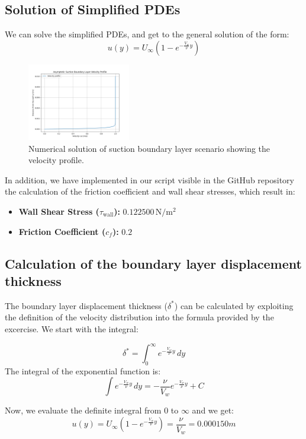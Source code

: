 \documentclass{article}
\begin{document}
\subsection{Solution of Simplified PDEs}
We can solve the simplified PDEs, and get to the general solution of the form:
\[
u(y) = U_\infty \left(1 - e^{-\frac{V_w}{\nu} y}\right)
\]
\begin{figure}[]
    \centering
    \includegraphics[width=0.4\textwidth]{output_plot.png}
    \caption{Numerical solution of suction boundary layer scenario showing the velocity profile.}
    \label{fig:suction boundary layer_solution}
\end{figure}

In addition, we have implemented in our script visible in the GitHub repository \cite{GitHubRepo} the calculation of the friction coefficient and wall shear stresses, which result in:
\begin{itemize}
    \item \textbf{Wall Shear Stress (\(\tau_{\text{wall}}\)):} \(0.122500 \, \mathrm{N/m^2}\)
    \item \textbf{Friction Coefficient (\(c_f\)):} \(0.2\)
\end{itemize}


\subsection{Calculation of the boundary layer displacement thickness}
The boundary layer displacement thickness (\(\delta^*\)) can be calculated by exploiting the definition of the velocity distribution into the formula provided by the excercise.
We start with the integral:

\[
\delta^* = \int_0^\infty e^{-\frac{V_w}{\nu} y} \, dy
\]
The integral of the exponential function is:
\[
\int e^{-\frac{V_w}{\nu} y} \, dy = -\frac{\nu}{V_w} e^{-\frac{V_w}{\nu} y} + C
\]

Now, we evaluate the definite integral from \(0\) to \(\infty\) and we get:
\[
u(y) = U_\infty \left(1 - e^{-\frac{V_w}{\nu} y}\right) = \frac{\nu}{V_w} = 0.000150 m
\]
\end{document}
